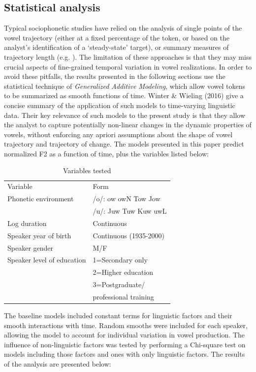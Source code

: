 \documentclass[12pt]{article}
\begin{document}
\subsection{Statistical analysis}

Typical sociophonetic studies have relied on the analysis of single points of the vowel trajectory (either at a fixed percentage of the token, or based on the analyst's identification of a `steady-state' target), or summary measures of trajectory length (e.g. ). The limitation of these approaches is that they may miss crucial aspects of fine-grained temporal variation in vowel realizations. In order to avoid these pitfalls, the results presented in the following sections use the statistical technique of \textit{Generalized Additive Modeling}, which allow vowel tokens to be summarized as smooth functions of time. Winter \& Wieling (2016) give a concise summary of the application of such models to time-varying linguistic data. Their key relevance of such models to the present study is that they allow the analyst to capture potentially non-linear changes in the dynamic properties of vowels, without enforcing any apriori assumptions about the shape of vowel trajectory and trajectory of change. The models presented in this paper predict normalized F2 as a function of time, plus the variables listed below:

\vspace*{6pt}
\begin{table}[htbp]
\centering
\begin{tabular}{l|l|}
Variable&Form \\
Phonetic environment &/o/: ow owN Tow Jow\\& /u/: Juw Tuw Kuw uwL \\
Log duration& Continuous \\
Speaker year of birth& Continuous (1935-2000)\\
Speaker gender& M/F \\
Speaker level of education & 1=Secondary only\\& 2=Higher education\\&3=Postgraduate/\\&professional training\\
\end{tabular}
\caption{Variables tested}
\end{table}
\vspace*{6pt}
The baseline models included constant terms for linguistic factors and their smooth interactions with time. Random smooths were included for each speaker, allowing the model to account for individual variation in vowel production.
The influence of non-linguistic factors was tested by performing a Chi-square test on models including those factors and ones with only linguistic factors. The results of the analysis are presented below:
\end{document}
